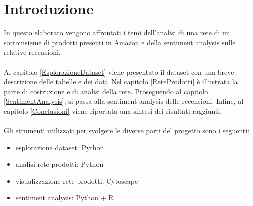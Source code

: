 \section{Introduzione}
In questo elaborato vengono affrontati i temi dell'analisi di una rete di un sottoinsieme di prodotti presenti in Amazon e della sentiment analysis sulle relative recensioni.
\\\\
Al capitolo \ref{EsplorazioneDataset} viene presentato il dataset con una breve descrizione delle tabelle e dei dati. Nel capitolo \ref{ReteProdotti} è illustrata la parte di costruzione e di analisi della rete. Proseguendo al capitolo \ref{SentimentAnalysis}, si passa alla sentiment analysis delle recensioni. Infine, al capitolo \ref{Conclusioni} viene riportata una sintesi dei risultati raggiunti.
\\\\
Gli strumenti utilizzati per svolgere le diverse parti del progetto sono i seguenti:
\begin{itemize}
    \item esplorazione dataset: Python
    \item analisi rete prodotti: Python
    \item visualizzazione rete prodotti: Cytoscape
    \item sentiment analysis: Python + R
\end{itemize}